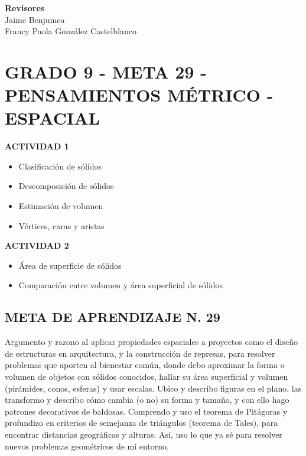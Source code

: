 \documentclass[12pt,a4paper]{article}
\begin{document}
\textbf{Revisores}\\
Jaime Benjumea\\
Francy Paola González Castelblanco

\newpage


\section*{GRADO 9 - META 29 - PENSAMIENTOS MÉTRICO - ESPACIAL}

\begin{tcolorbox}[colback=fondoazul, colframe=azuloscuro, title=\textbf{Guía 85} (Duración 13 h), breakable]
\textbf{ACTIVIDAD 1}
\begin{itemize}[nosep]
    \item Clasificación de sólidos
    \item Descomposición de sólidos
    \item Estimación de volumen
    \item Vértices, caras y aristas
\end{itemize}

\textbf{ACTIVIDAD 2}
\begin{itemize}[nosep]
    \item Área de superficie de sólidos
    \item Comparación entre volumen y área superficial de sólidos
\end{itemize}
\end{tcolorbox}

\subsection*{META DE APRENDIZAJE N. 29}

Argumento y razono al aplicar propiedades espaciales a proyectos como el diseño de estructuras en arquitectura, y la construcción de represas, para resolver problemas que aporten al bienestar común, donde debo aproximar la forma o volumen de objetos con sólidos conocidos, hallar su área superficial y volumen (pirámides, conos, esferas) y usar escalas. Ubico y describo figuras en el plano, las transformo y describo cómo cambia (o no) su forma y tamaño, y con ello hago patrones decorativos de baldosas. Comprendo y uso el teorema de Pitágoras y profundizo en criterios de semejanza de triángulos (teorema de Tales), para encontrar distancias geográficas y alturas. Así, uso lo que ya sé para resolver nuevos problemas geométricos de mi entorno.
\end{document}

